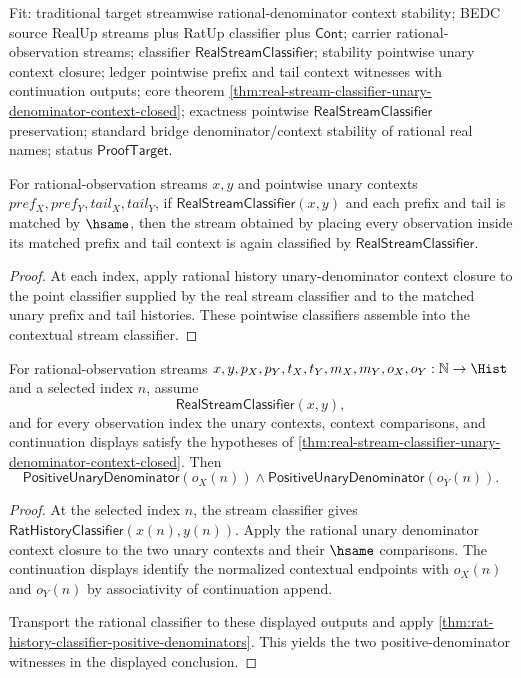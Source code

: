 Fit: traditional target streamwise rational-denominator context stability; BEDC
source RealUp streams plus RatUp classifier plus $\mathsf{Cont}$; carrier
rational-observation streams; classifier $\mathsf{RealStreamClassifier}$;
stability pointwise unary context closure; ledger pointwise prefix and tail
context witnesses with continuation outputs; core theorem
\autoref{thm:real-stream-classifier-unary-denominator-context-closed};
exactness pointwise $\mathsf{RealStreamClassifier}$ preservation; standard
bridge denominator/context stability of rational real names; status
$\mathsf{ProofTarget}$.

\begin{theorem}
\label{thm:real-stream-classifier-unary-context-closed}
For rational-observation streams $x,y$ and pointwise unary contexts
$pref_X,pref_Y,tail_X,tail_Y$, if $\mathsf{RealStreamClassifier}(x,y)$ and
each prefix and tail is matched by $\hsame$, then the stream obtained by
placing every observation inside its matched prefix and tail context is again
classified by $\mathsf{RealStreamClassifier}$.
\end{theorem}
\begin{proof}
At each index, apply rational history unary-denominator context closure to the
point classifier supplied by the real stream classifier and to the matched
unary prefix and tail histories. These pointwise classifiers assemble into the
contextual stream classifier.
\end{proof}

\begin{theorem}
\label{thm:real-stream-classifier-unary-denominator-context-selected-positive-denominators}
For rational-observation streams
$x,y,p_X,p_Y,t_X,t_Y,m_X,m_Y,o_X,o_Y:\mathbb{N}\to\Hist$ and a selected
index $n$, assume
$$
\mathsf{RealStreamClassifier}(x,y),
$$
and for every observation index the unary contexts, context comparisons, and
continuation displays satisfy the hypotheses of
\autoref{thm:real-stream-classifier-unary-denominator-context-closed}. Then
$$
\mathsf{PositiveUnaryDenominator}(o_X(n))\land
\mathsf{PositiveUnaryDenominator}(o_Y(n)).
$$
\end{theorem}
\begin{proof}
At the selected index $n$, the stream classifier gives
$\mathsf{RatHistoryClassifier}(x(n),y(n))$. Apply the rational unary
denominator context closure to the two unary contexts and their $\hsame$
comparisons. The continuation displays identify the normalized contextual
endpoints with $o_X(n)$ and $o_Y(n)$ by associativity of continuation append.

Transport the rational classifier to these displayed outputs and apply
\autoref{thm:rat-history-classifier-positive-denominators}. This yields the two
positive-denominator witnesses in the displayed conclusion.
\end{proof}

